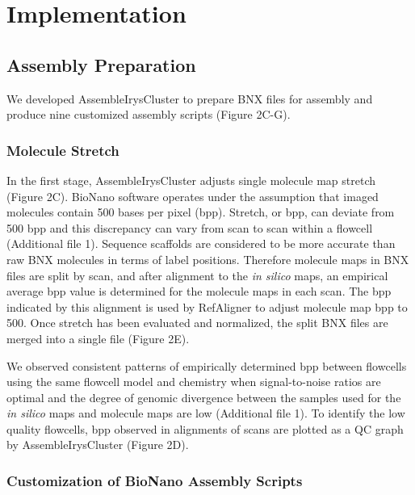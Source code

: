 \documentclass{bmcart}
\begin{document}
\section*{Implementation}
\subsection*{Assembly Preparation}
We developed AssembleIrysCluster to prepare BNX files for assembly and produce nine customized assembly scripts (Figure 2C-G).
\subsubsection*{Molecule Stretch}
In the first stage, AssembleIrysCluster adjusts single molecule map stretch (Figure 2C). BioNano software operates under the assumption that imaged molecules contain 500 bases per pixel (bpp). Stretch, or bpp, can deviate from 500 bpp and this discrepancy can vary from scan to scan within a flowcell (Additional file 1). Sequence scaffolds are considered to be more accurate than raw BNX molecules in terms of label positions. Therefore molecule maps in BNX files are split by scan, and after alignment to the \textit{in silico} maps, an empirical average bpp value is determined for the molecule maps in each scan. The bpp indicated by this alignment is used by RefAligner to adjust molecule map bpp to 500. Once stretch has been evaluated and normalized, the split BNX files are merged into a single file (Figure 2E).

We observed consistent patterns of empirically determined bpp between flowcells using the same flowcell model and chemistry when signal-to-noise ratios are optimal and the degree of genomic divergence between the samples used for the \textit{in silico} maps and molecule maps are low (Additional file 1). To identify the low quality flowcells, bpp observed in alignments of scans are plotted as a QC graph by AssembleIrysCluster (Figure 2D). 

\subsubsection*{Customization of BioNano Assembly Scripts}
\end{document}
